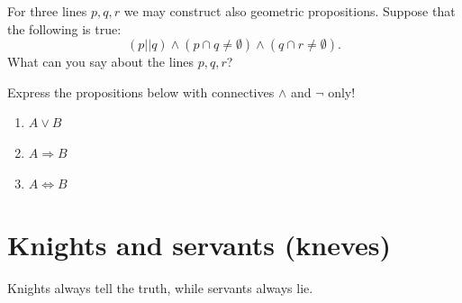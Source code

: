 \documentclass[11pt,paper=b5,footinclude,headinclude]{scrbook} %
\theoremstyle{remark}
\theoremstyle{definition} %
\theoremstyle{theorem} %
\newtheorem{ex}{Exercise\hypertarget{sol:\theex}}[chapter]
\begin{document}
\begin{ex}
\end{ex} \begin{ex} For three lines $p,q,r$ we may construct also geometric propositions.
Suppose that the following is true:
\[
(p||q)\wedge(p\cap q\neq\emptyset)\wedge(q\cap r\neq\emptyset).
\]
What can you say about the lines $p,q,r$?



\end{ex}
\begin{ex} Express the propositions below with connectives $\wedge$ and $\neg$
only!
\begin{enumerate}
\item $A\vee B$
\item $A\Rightarrow B$
\item $A\Leftrightarrow B$
\end{enumerate}
\end{ex}

\section{Knights and servants (kneves)}
Knights always tell the truth, while servants always lie.
\end{document}
